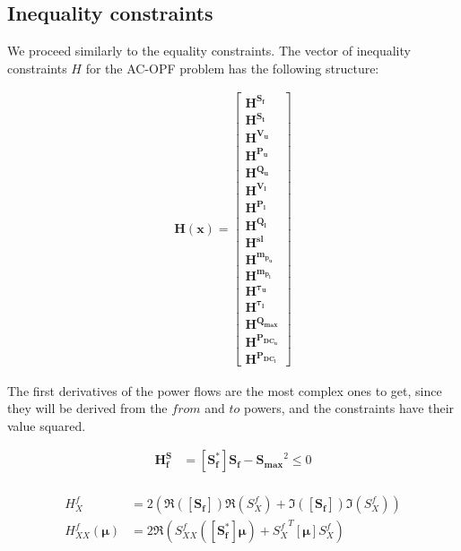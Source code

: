 \subsection{Inequality constraints}

We proceed similarly to the equality constraints. The vector of inequality constraints $H$ for the AC-OPF problem has the following structure:

\begin{equation}
    \begin{split}
        \bm{H}(\bm{x}) = \begin{bmatrix}
            \bm{H^{S_f}}\\
            \bm{H^{S_t}}\\
            \bm{H^{V_u}}\\
            \bm{H^{P_u}}\\
            \bm{H^{Q_u}}\\
            \bm{H^{V_l}}\\
            \bm{H^{P_l}}\\
            \bm{H^{Q_l}}\\
            \bm{H^{sl}}\\
            \bm{H^{m_{p_u}}}\\
            \bm{H^{m_{p_l}}}\\
            \bm{H^{\tau_u}}\\
            \bm{H^{\tau_l}}\\
            \bm{H^{Q_{max}}}\\
            \bm{H^{P_{DC_u}}}\\
            \bm{H^{P_{DC_l}}}
            \end{bmatrix}
    \end{split}
\end{equation}

The first derivatives of the power flows are the most complex ones to get, since they will be derived from the $from$ and $to$ powers, and the constraints have their value squared. 

\begin{equation}
    \begin{split}
        \bm{H^S_f} &= [\bm{S_f^*}] \bm{S_f} - \bm{S_{max}}^2 \leq 0\\
    \end{split}
\end{equation}

\begin{equation}
\begin{split}
    H^f_X &= 2 (\Re([\bm{S_f}]) \Re(S^f_X) + \Im([\bm{S_f}]) \Im(S^f_X))\\
    H^f_{XX}(\bm{\mu}) &= 2 \Re(S^f_{XX}([\bm{S_f^*}]\bm{\mu}) + {S^f_X}^T [\bm{\mu}] S^f_X)
\end{split}
\end{equation}

